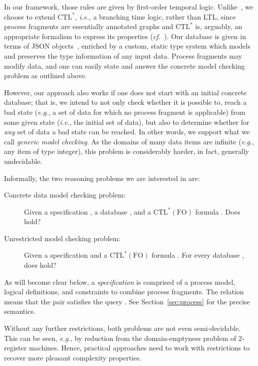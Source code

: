 \documentclass{llncs}
\newcommand{\eg}{\textit{e.g.}}
\newcommand{\ie}{\textit{i.e.}}
\newcommand{\cf}{\textit{cf.}}
\newcommand{\CTLs}{\ensuremath{\text{CTL}^\ast}\xspace}
\newcommand{\CTLsFO}{\ensuremath{\text{CTL}^\ast(\text{FO})}\xspace}
\begin{document}
In our framework, those rules are given by first-order temporal logic.
Unlike~\cite{DBLP:conf/bpm/DamaggioDHV11}, we choose to extend \CTLs, \ie, a branching time logic, rather than LTL, since process fragments are essentially annotated graphs and \CTLs is, arguably, an appropriate formalism to express its properties (\cf~\cite{clarke_em-etal:1999a}).
Our database is given in terms of JSON objects~\cite{JSON}, enriched by a custom, static type system which models and preserves the type information of any input data.
Process fragments may modify data, and one can easily state and answer the concrete model checking problem as outlined above.

However, our approach also works if
one does not start with an initial concrete database; that is, we intend to not only check
whether it is possible to, reach a bad state (\eg, a set of data for
which no process fragment is applicable) from some given state (\ie,
the initial set of data), but also to determine whether for \emph{any}
set of data a bad state can be reached.
In other words, we support what we call \emph{generic model checking}.
As the domains of many data items are infinite (\eg, any item of type integer), this problem is considerably harder, in fact, generally undecidable.

Informally, the two reasoning problems we are interested in are:
\begin{description}
\item[Concrete data model checking problem:] Given a specification , a
  database , and a \CTLsFO  formula . Does
   hold?
\item[Unrestricted model checking problem:] Given a specification  and
  a \CTLsFO  formula . For every database , does  hold?
\end{description}
As will become clear below, a \emph{specification} is comprised of a process model,
logical definitions, and constraints to combine process fragments. The relation 
 means that the pair  satisfies the query .
See Section~\ref{sec:process} for the precise semantics.

Without any further restrictions, both problems are not even semi-decidable.  This
can be seen, \eg, by reduction from the domain-emptyness problem of 2-register
machines. Hence, practical approaches need to work with restrictions to recover more
pleasant complexity properties.
\end{document}
